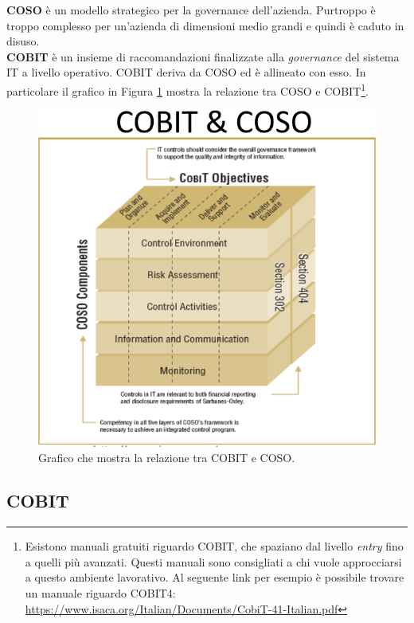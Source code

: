 \textbf{COSO} è un modello strategico per la governance dell'azienda. Purtroppo 
è troppo complesso per un'azienda di dimensioni medio grandi e quindi è caduto 
in disuso.\\
\newline
\textbf{COBIT} è un insieme di raccomandazioni finalizzate alla \textit{governance} 
del sistema IT a livello operativo.
COBIT deriva da COSO ed è allineato con esso. In particolare il grafico in Figura
\ref{fig:cobit:coso:relazione} mostra la relazione tra COSO e COBIT\footnote{Esistono manuali gratuiti 
riguardo COBIT, che spaziano dal livello \textit{entry} fino a quelli più 
avanzati. Questi manuali sono consigliati a chi vuole approcciarsi a questo ambiente 
lavorativo. Al seguente link per esempio è possibile trovare un manuale riguardo 
COBIT4:  \url{https://www.isaca.org/Italian/Documents/CobiT-41-Italian.pdf}}.
\begin{figure}[h!]
        \begin{center}
                \includegraphics[scale=2.0]{res/img/cobit_coso_cube}
        \end{center}
        \caption{Grafico che mostra la relazione tra COBIT e COSO.}
        \label{fig:cobit:coso:relazione}
\end{figure}

\subsection{COBIT}
\label{COBIT}

